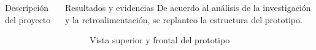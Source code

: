 \documentclass{beamer}
\begin{document}
\begin{frame}[fragile]{}
\begin{columns}[t]
\begin{column}{0.46\textwidth}
\begin{block}{Descripción del proyecto}
\begin{minipage}[t]{1\linewidth}
			\end{minipage} 
	  	\end{block}
	  \end{column}
	
	 \begin{column}{0.46\linewidth}
	 	\begin{block}{Resultados y evidencias}
	 	De acuerdo al análisis de la investigación y la  retroalimentación, se replanteo la estructura del prototipo.
	 	\begin{figure}[H]
	 		\centering
	 		\caption{Vista superior y frontal del prototipo}
	 	\end{figure}
	 	

	 	 
	 	\end{block}
	 \end{column}
	\end{columns}
 
 	\justifying
 	\begin{columns}[t]
 

\end{columns}
\end{frame}
\end{document}
